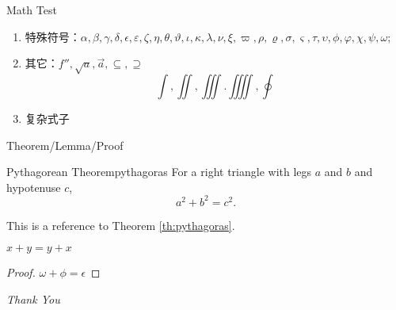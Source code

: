 \begin{frame}{Math Test}
    \begin{enumerate}
        \item 特殊符号：$\alpha,\beta,\gamma,\delta,\epsilon,\varepsilon,\zeta,\eta,\theta,\vartheta,\iota,\kappa,\lambda,\nu,\xi,\varpi,\rho,\varrho,\sigma,\varsigma,\tau,\upsilon,\phi,\varphi,\chi,\psi,\omega$;
        \item 其它：$f'',\sqrt{a},\overrightarrow{a},\subseteq,\supseteq$
        \[\int,\iint,\iiint.\iiiint,\oint\]
        \item 复杂式子
    \end{enumerate}
\end{frame}

\begin{frame}{Theorem/Lemma/Proof}
	\begin{theo}{Pythagorean Theorem}{pythagoras}
		For a right triangle with legs $a$ and $b$ and hypotenuse $c$,
		\[
		a^2 + b^2 = c^2. 
		\]
	\end{theo}
	This is a reference to Theorem \ref{th:pythagoras}.
    \begin{lemma}
    $ x + y = y + x  $
    \end{lemma}
    \begin{proof}
    $\omega +\phi = \epsilon $
    \end{proof}
\end{frame}

\begin{frame}{}
    \centering \Huge
    \emph{Thank You}
\end{frame}

\begin{frame}[allowframebreaks]
	\printbibliography
\end{frame}


